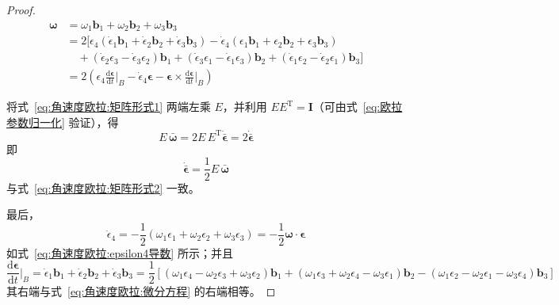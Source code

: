 \begin{proof}
\begin{equation}
    \begin{aligned}
        \bm{\omega} &= \omega_1\mathbf{b}_1+\omega_2\mathbf{b}_2+\omega_3\mathbf{b}_3\\
        &= 2[\epsilon_4(\dot{\epsilon}_1\mathbf{b}_1+\dot{\epsilon}_2\mathbf{b}_2+\dot{\epsilon}_3\mathbf{b}_3) - \dot{\epsilon}_4(\epsilon_1\mathbf{b}_1+\epsilon_2\mathbf{b}_2+\epsilon_3\mathbf{b}_3)\\
        &\quad + (\dot{\epsilon}_2\epsilon_3-\dot{\epsilon}_3\epsilon_2)\mathbf{b}_1+(\dot{\epsilon}_3\epsilon_1-\dot{\epsilon}_1\epsilon_3)\mathbf{b}_2+(\dot{\epsilon}_1\epsilon_2-\dot{\epsilon}_2\epsilon_1)\mathbf{b}_3]\\
        &= 2\left(\epsilon_4\frac{\mathrm{d}\bm{\epsilon}}{\mathrm{d}t}\Big|_{B} - \dot{\epsilon}_4\bm{\epsilon} - \bm{\epsilon}\times\frac{\mathrm{d}\bm{\epsilon}}{\mathrm{d}t}\Big|_{B}\right)
    \end{aligned}
    \label{eq:角速度欧拉:omega推导}
\end{equation}

将式~\eqref{eq:角速度欧拉:矩阵形式1} 两端左乘 $E$，并利用 $EE^{\mathrm{T}}=\bm{I}$（可由式~\eqref{eq:欧拉参数归一化} 验证），得
\begin{equation}
    E\,\bar{\bm{\omega}} = 2E\,E^{\mathrm{T}}\dot{\bar{\bm{\epsilon}}} = 2\dot{\bar{\bm{\epsilon}}}
\end{equation}
即
\begin{equation}
    \dot{\bar{\bm{\epsilon}}} = \frac{1}{2}E\,\bar{\bm{\omega}}
\end{equation}
与式~\eqref{eq:角速度欧拉:矩阵形式2} 一致。

最后，
\begin{equation}
    \dot{\epsilon}_4 = -\frac{1}{2}(\omega_1\epsilon_1+\omega_2\epsilon_2+\omega_3\epsilon_3) = -\frac{1}{2}\bm{\omega}\cdot\bm{\epsilon}
    \label{eq:角速度欧拉:epsilon4推导}
\end{equation}
如式~\eqref{eq:角速度欧拉:epsilon4导数} 所示；并且
\begin{equation}
    \frac{\mathrm{d}\bm{\epsilon}}{\mathrm{d}t}\Big|_{B} = \dot{\epsilon}_1\mathbf{b}_1+\dot{\epsilon}_2\mathbf{b}_2+\dot{\epsilon}_3\mathbf{b}_3
    = \frac{1}{2}\left[(\omega_1\epsilon_4-\omega_2\epsilon_3+\omega_3\epsilon_2)\mathbf{b}_1
    + (\omega_1\epsilon_3+\omega_2\epsilon_4-\omega_3\epsilon_1)\mathbf{b}_2
    - (\omega_1\epsilon_2-\omega_2\epsilon_1-\omega_3\epsilon_4)\mathbf{b}_3\right]
    \label{eq:角速度欧拉:epsilon导数推导}
\end{equation}
其右端与式~\eqref{eq:角速度欧拉:微分方程} 的右端相等。

\end{proof}

